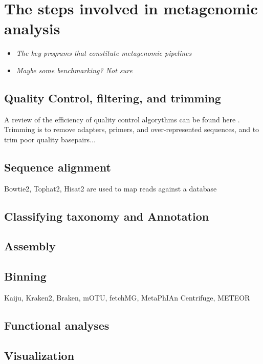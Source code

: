 \documentclass{article}
\begin{document}
\section{The steps involved in metagenomic analysis}
\begin{itemize}
	\item \emph{The key programs that constitute metagenomic pipelines}
	\item \emph{Maybe some benchmarking? Not sure}
\end{itemize}
\subsection{Quality Control, filtering, and trimming}
A review of the efficiency of quality control algorythms can be found here \cite{zhou2014assessment}.
Trimming is to remove adapters, primers, and over-represented sequences, and to trim poor quality basepairs...

\subsection{Sequence alignment}
Bowtie2, Tophat2, Hisat2 are used to map reads against a database

\subsection{Classifying taxonomy and Annotation}
\subsection{Assembly}
\subsection{Binning}
Kaiju, Kraken2, Braken, mOTU, fetchMG, MetaPhIAn Centrifuge, METEOR

\subsection{Functional analyses}
\subsection{Visualization}
\end{document}
